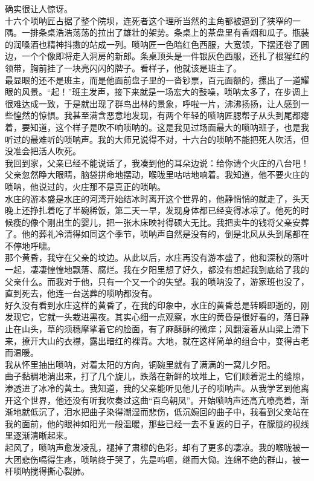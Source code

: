 确实很让人惊讶。\\

十六个唢呐匠占据了整个院坝，连死者这个理所当然的主角都被逼到了狭窄的一隅。一排条桌浩浩荡荡的拉出了雄壮的架势。条桌上的茶盘里有香烟和瓜子。瓶装的润嗓酒也精神抖擞的站成一列。唢呐匠一色暗红色西服，大宽领，下摆还卷了圆边，一个个像即将走入洞房的新郎。条桌顶头是一件银灰色西服，还扎了根猩红的领带，胸前挂了一块亮闪闪的牌子。看样子，他就该是班主了。\\

最显眼的还不是班主，而是他面前盘子里的一沓钞票，百元面额的，摞出了一道耀眼的风景。“起！”班主发声，接下来就是一场宏大的鼓噪，唢呐太多了，在步调上很难达成一致，于是就出现了群鸟出林的景象，呼啦一片，沸沸扬扬，让人感到一些惶然的惊惧。我甚至满含恶意地发现，有两个年轻的唢呐匠腮帮子从头到尾都瘪着，要知道，这个样子是吹不响唢呐的。这是我见过场面最大的唢呐班子，也是我听过的最难听的唢呐声。我的大师兄说得不对，十六台的唢呐不能把死人吹活，但没准会把活人吹死。\\

我回到家，父亲已经不能说话了，我凑到他的耳朵边说：给你请个火庄的八台吧！父亲忽然睁大眼睛，脑袋拼命地摆动，喉咙里咕咕地响着。我知道，他不要火庄的唢呐，他说过的，火庄那不是真正的唢呐。\\

水庄的游本盛是水庄的河湾开始结冰时离开这个世界的，他静悄悄的就走了，头天晚上还挣扎着吃了半碗稀饭，第二天一早，发现身体都已经变得冰凉了。他死的时候瘦的像个刚出生的婴儿，把一张木床映衬得硕大无比。我把卖牛的钱将父亲安葬了。他的葬礼冷清得如同这个季节，唢呐声自然是没有的，倒是北风从头到尾都在不停地呼啸。\\

那个黄昏，我守在父亲的坟边。从此以后，水庄再没有游本盛了，他和深秋的落叶一起，凄凄惶惶地飘落、腐烂。我在夕阳里想了好久，都没有想起我到底给了我的父亲什么。而我对于他，只有一个又一个的失望。我的唢呐没了，游家班也没了，直到死去，他连一台送葬的唢呐都没有。\\

好久没有看到水庄这样的黄昏了，在我的印象中，水庄的黄昏总是转瞬即逝的，刚发现它，它就一头栽进黑夜。其实心细一点观察，水庄的黄昏是很好看的，落日静止在山头，草的须穗摩挲着它的脸面，有了麻酥酥的微痒；风翻滚着从山梁上滑下来，撩开大山的衣襟，露出暗红的裸背。大地，就在这样简单的组合中，变得古老而温暖。\\

我从怀里抽出唢呐，对着太阳的方向，铜碗里就有了满满的一窝儿夕阳。\\

曲子黏稠地淌出来，打了几个旋儿，跌落在新鲜的坟堆上，它们顺着泥土的缝隙，渗透进了冰冷的黄土。我知道，我的父亲能听见他儿子的唢呐声。从我学艺到他离开这个世界，他还没有听我吹奏过这曲“百鸟朝凤”。开始唢呐声还高亢嘹亮着，渐渐地就低沉了，泪水把曲子染得潮湿而悲伤，低沉婉回的曲子中，我看到父亲站在我的面前，他的眼神如阳光一般温暖，那些已经一去不复返的日子，在朦胧的视线里逐渐清晰起来。\\

起风了，唢呐声愈发凌乱，褪掉了肃穆的色彩，却有了更多的凄凉。我的喉咙被一大团悲伤嗝得生疼，唢呐终于哭了，先是呜咽，继而大恸。连绵不绝的群山，被一杆唢呐搅得撕心裂肺。\\
